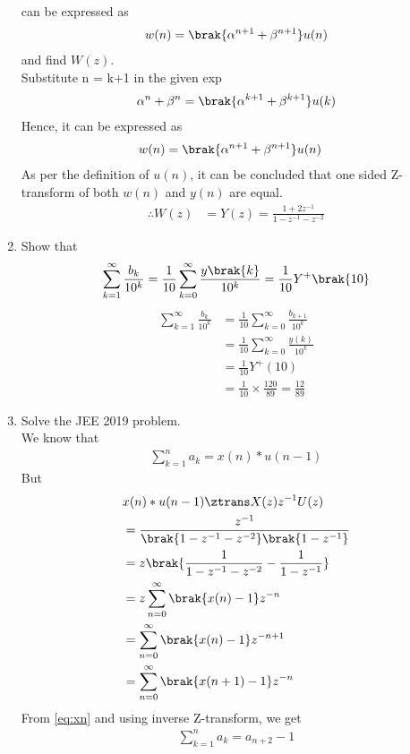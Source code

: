 \documentclass[journal,12pt,twocolumn]{IEEEtran}
\renewcommand\thesection{\arabic{section}}
\begin{document}
\begin{enumerate}[label=\thesection.\arabic*,ref=\thesection.\theenumi]
can be expressed as 
\begin{align}
	w(n) =\brak{\alpha^{n+1} + \beta^{n+1}}u(n)
\end{align}
		and find $W(z)$.\\
\solution Substitute n = k+1 in the given exp
\begin{align}
\alpha^n + \beta^n = \brak{\alpha^{k + 1} + \beta^{k + 1}}u(k)
\end{align}
Hence, it can be expressed as
\begin{align}
w(n) &= \brak{\alpha^{n+1} + \beta^{n+1}}u(n)
\end{align}
As per the definition of $u(n)$, it can be concluded that one sided Z-transform of both $w(n)$ and $y(n)$ are equal.
\begin{align}
\therefore W(z) &= Y(z) = \frac{1 + 2z^{-1}}{1 - z^{-1} - z^{-2}}
\end{align}

 \item Show that 
\begin{align}
	\sum_{k=1}^{\infty}\frac{b_k}{10^k} =
	\frac{1}{10}\sum_{k=0}^{\infty}\frac{y\brak{k}}{10^k} =\frac{1}{10}Y^{+}\brak{{10}}
\end{align}
\solution 
\begin{align}
\sum_{k=1}^{\infty}\frac{b_k}{10^k} &= \frac{1}{10}\sum_{k = 0}
^{\infty}\frac{b_{k+1}}{10^k}\\ &= \frac{1}{10}\sum_{k = 0}^{\infty}\frac{y(k)}{10^k}\\ &= \frac{1}{10}Y^+(10)\\ &= \frac{1}{10}\times\frac{120}{89} = \frac{12}{89}
\end{align}

\item Solve the JEE 2019 problem.\\
\solution We know that
\begin{align}
\sum_{k = 1}^{n}a_k = x(n)*u(n - 1)
\end{align}
But
\begin{align}
&x(n)*u(n - 1) \ztrans X(z)z^{-1}U(z) \\
&= \frac{z^{-1}}{\brak{1 - z^{-1} - z^{-2}}\brak{1 - z^{-1}}}\\
&= z\brak{\frac{1}{1 - z^{-1} - z^{-2}} - \frac{1}{1 - z^{-1}}}\\
&=z\sum_{n = 0}^{\infty}\brak{x(n) - 1}z^{-n}\\
&= \sum_{n = 0}^{\infty}\brak{x(n) - 1}z^{-n + 1}\\
&= \sum_{n = 0}^{\infty}\brak{x(n + 1) - 1}z^{-n}\\
\end{align}
From \eqref{eq:xn} and using inverse Z-transform, we get
\begin{align}
\sum_{k = 1}^{n}a_k = a_{n+2} - 1
\end{align}
\end{enumerate}
\end{document}
